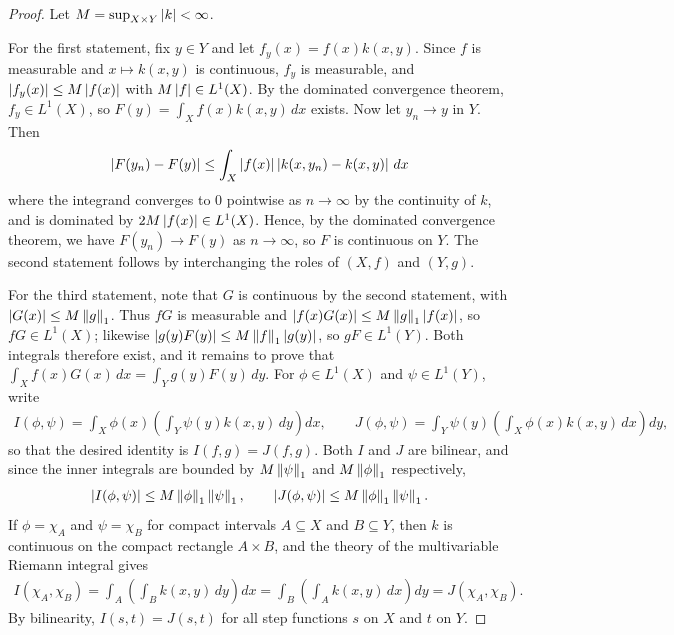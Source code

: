 \begin{proof}
    Let $M = \sup_{X \times Y} \left| k \right| < \infty$.

    For the first statement, fix $y \in Y$ and let $f_{y}(x) = f(x)k(x,y)$. Since $f$ is measurable and $x \mapsto k(x,y)$ is continuous, $f_{y}$ is measurable, and $\left| f_{y}(x) \right| \leq M\left| f(x) \right|$ with $M\left| f \right| \in L^{1}(X)$. By the dominated convergence theorem, $f_{y} \in L^{1}(X)$, so $F(y) = \int_{X} f(x)k(x,y) \, dx$ exists. Now let $y_{n} \to y$ in $Y$. Then
    \begin{align}
        \left| F(y_{n})-F(y) \right| \leq \int_{X} \left| f(x) \right| \left| k(x,y_{n})-k(x,y) \right| \, dx
    \end{align}
    where the integrand converges to $0$ pointwise as $n \to \infty$ by the continuity of $k$, and is dominated by $2M\left| f(x) \right| \in L^{1}(X)$. Hence, by the dominated convergence theorem, we have $F(y_{n}) \to F(y)$ as $n \to \infty$, so $F$ is continuous on $Y$. The second statement follows by interchanging the roles of $(X,f)$ and $(Y,g)$.

    For the third statement, note that $G$ is continuous by the second statement, with $\left| G(x) \right| \leq M\left\lVert g\right\rVert_{1}$. Thus $fG$ is measurable and $\left| f(x)G(x) \right| \leq M\left\lVert g\right\rVert_{1}\left| f(x) \right|$, so $fG \in L^{1}(X)$; likewise $\left| g(y)F(y) \right| \leq M\left\lVert f\right\rVert_{1}\left| g(y) \right|$, so $gF \in L^{1}(Y)$. Both integrals therefore exist, and it remains to prove that $\int_{X} f(x)G(x) \, dx = \int_{Y} g(y)F(y) \, dy$. For $\phi \in L^{1}(X)$ and $\psi \in L^{1}(Y)$, write
    \begin{align}
        I(\phi,\psi) = \int_{X} \phi(x)\left(\int_{Y} \psi(y)k(x,y) \, dy\right) dx, \qquad J(\phi,\psi) = \int_{Y} \psi(y)\left(\int_{X} \phi(x)k(x,y) \, dx\right) dy,
    \end{align}
    so that the desired identity is $I(f,g) = J(f,g)$. Both $I$ and $J$ are bilinear, and since the inner integrals are bounded by $M\left\lVert\psi\right\rVert_{1}$ and $M\left\lVert\phi\right\rVert_{1}$ respectively,
    \begin{align}
        \left| I(\phi,\psi) \right| \leq M\left\lVert\phi\right\rVert_{1}\left\lVert\psi\right\rVert_{1}, \qquad \left| J(\phi,\psi) \right| \leq M\left\lVert\phi\right\rVert_{1}\left\lVert\psi\right\rVert_{1}.
    \end{align}
    If $\phi = \chi_{A}$ and $\psi = \chi_{B}$ for compact intervals $A \subseteq X$ and $B \subseteq Y$, then $k$ is continuous on the compact rectangle $A \times B$, and the theory of the multivariable Riemann integral gives
    \begin{align}
        I(\chi_{A},\chi_{B}) = \int_{A}\left(\int_{B} k(x,y) \, dy\right) dx = \int_{B}\left(\int_{A} k(x,y) \, dx\right) dy = J(\chi_{A},\chi_{B}).
    \end{align}
    By bilinearity, $I(s,t) = J(s,t)$ for all step functions $s$ on $X$ and $t$ on $Y$.


\end{proof}
